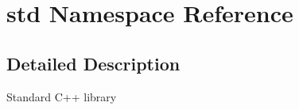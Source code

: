 \hypertarget{namespacestd}{}\section{std Namespace Reference}
\label{namespacestd}


\subsection{Detailed Description}
Standard C++ library 